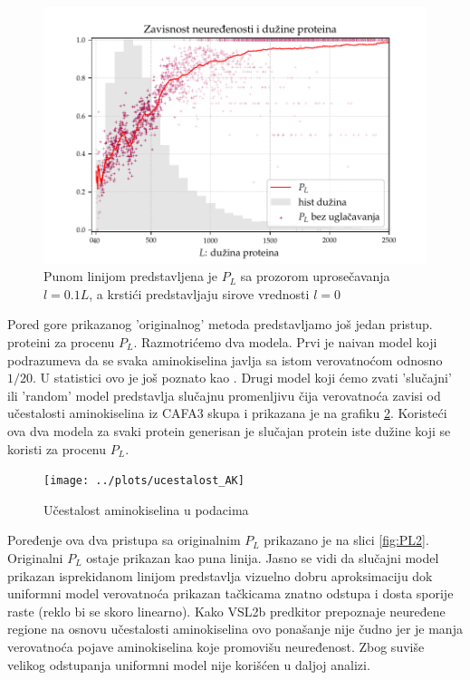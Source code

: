 \begin{figure}[th]
\centering
\includegraphics[]{../plots/PL_F}
\decoRule
\caption {
 Punom linijom predstavljena je $P_L$ sa prozorom uprosečavanja $l = 0.1L$,
 a krstići predstavljaju sirove vrednosti $l = 0$ 
}
\label{fig:PL1}
\end{figure}


Pored gore prikazanog 'originalnog' metoda predstavljamo još jedan pristup.
  proteini za procenu $P_L$.
Razmotrićemo dva modela. Prvi je naivan model 
koji podrazumeva da se svaka aminokiselina javlja sa istom verovatnoćom odnosno
$1/20$. U statistici ovo je još poznato kao .  Drugi
model koji ćemo zvati 'slučajni' ili 'random' model predstavlja slučajnu
promenljivu čija verovatnoća zavisi od učestalosti aminokiselina iz CAFA3 skupa
i prikazana je na grafiku \ref{fig:ucestalost_AK}.  Koristeći ova dva modela za
svaki protein generisan je slučajan protein iste dužine koji se koristi za
procenu $P_L$.


\begin{figure}[th]
\centering
\texttt{[image: ../plots/ucestalost\_AK]}
\decoRule
\caption{Učestalost aminokiselina u podacima}
\label{fig:ucestalost_AK}
\end{figure}



Poređenje ova dva pristupa sa originalnim $P_L$ prikazano je na slici
\ref{fig:PL2}.  Originalni $P_L$ ostaje prikazan kao puna linija. Jasno se vidi
da slučajni model prikazan isprekidanom linijom predstavlja vizuelno dobru
aproksimaciju dok uniformni model verovatnoća prikazan tačkicama znatno odstupa
i dosta sporije raste (reklo bi se skoro linearno). Kako VSL2b predkitor
prepoznaje neuređene regione na osnovu učestalosti aminokiselina ovo ponašanje
nije čudno jer je manja verovatnoća pojave aminokiselina koje promovišu
neuređenost. Zbog suviše velikog odstupanja uniformni model nije korišćen u
daljoj analizi.


